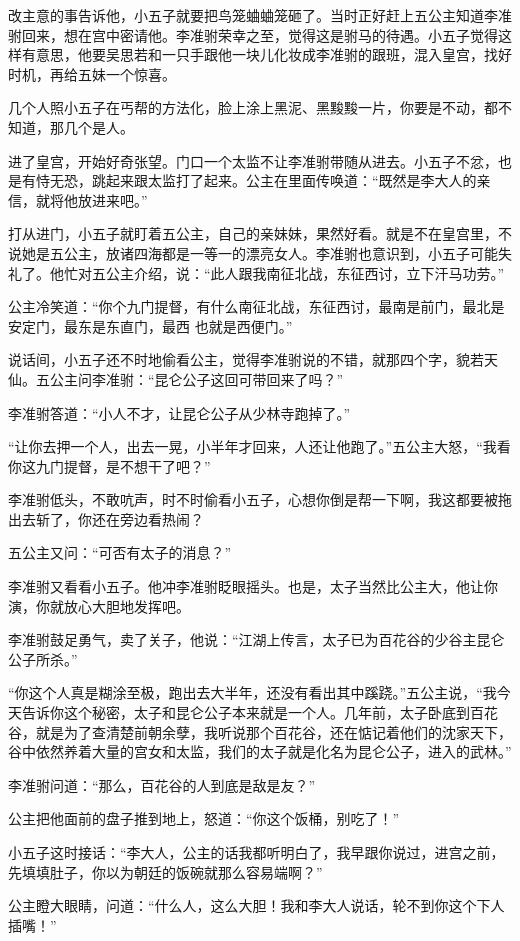 改主意的事告诉他，小五子就要把鸟笼蛐蛐笼砸了。当时正好赶上五公主知道李准驸回来，想在宫中密请他。李准驸荣幸之至，觉得这是驸马的待遇。小五子觉得这样有意思，他要吴思若和一只手跟他一块儿化妆成李准驸的跟班，混入皇宫，找好时机，再给五妹一个惊喜。

几个人照小五子在丐帮的方法化，脸上涂上黑泥、黑黢黢一片，你要是不动，都不知道，那几个是人。

进了皇宫，开始好奇张望。门口一个太监不让李准驸带随从进去。小五子不忿，也是有恃无恐，跳起来跟太监打了起来。公主在里面传唤道：“既然是李大人的亲信，就将他放进来吧。”

打从进门，小五子就盯着五公主，自己的亲妹妹，果然好看。就是不在皇宫里，不说她是五公主，放诸四海都是一等一的漂亮女人。李准驸也意识到，小五子可能失礼了。他忙对五公主介绍，说：“此人跟我南征北战，东征西讨，立下汗马功劳。”

公主冷笑道：“你个九门提督，有什么南征北战，东征西讨，最南是前门，最北是安定门，最东是东直门，最西
也就是西便门。”

说话间，小五子还不时地偷看公主，觉得李准驸说的不错，就那四个字，貌若天仙。五公主问李准驸：“昆仑公子这回可带回来了吗？”

李准驸答道：“小人不才，让昆仑公子从少林寺跑掉了。”

“让你去押一个人，出去一晃，小半年才回来，人还让他跑了。”五公主大怒，“我看你这九门提督，是不想干了吧？”

李准驸低头，不敢吭声，时不时偷看小五子，心想你倒是帮一下啊，我这都要被拖出去斩了，你还在旁边看热闹？

五公主又问：“可否有太子的消息？”

李准驸又看看小五子。他冲李准驸眨眼摇头。也是，太子当然比公主大，他让你演，你就放心大胆地发挥吧。

李准驸鼓足勇气，卖了关子，他说：“江湖上传言，太子已为百花谷的少谷主昆仑公子所杀。”

“你这个人真是糊涂至极，跑出去大半年，还没有看出其中蹊跷。”五公主说，“我今天告诉你这个秘密，太子和昆仑公子本来就是一个人。几年前，太子卧底到百花谷，就是为了查清楚前朝余孽，我听说那个百花谷，还在惦记着他们的沈家天下，谷中依然养着大量的宫女和太监，我们的太子就是化名为昆仑公子，进入的武林。”

李准驸问道：“那么，百花谷的人到底是敌是友？”

公主把他面前的盘子推到地上，怒道：“你这个饭桶，别吃了！”

小五子这时接话：“李大人，公主的话我都听明白了，我早跟你说过，进宫之前，先填填肚子，你以为朝廷的饭碗就那么容易端啊？”

公主瞪大眼睛，问道：“什么人，这么大胆！我和李大人说话，轮不到你这个下人插嘴！”

